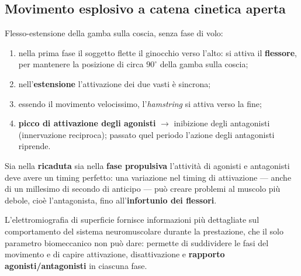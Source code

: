 \subsection{Movimento esplosivo a catena cinetica aperta}
Flesso-estensione della gamba sulla coscia, senza fase di volo:
\begin{enumerate}
  \item nella prima fase il soggetto flette il ginocchio verso l'alto: si attiva il
    \textbf{flessore}, per mantenere la posizione di circa $90^\circ$ della gamba sulla coscia;
  \item nell'\textbf{estensione} l'attivazione dei due vasti è sincrona;
  \item essendo il movimento velocissimo, l'\textit{hamstring} si attiva verso la fine;
  \item \textbf{picco di attivazione degli agonisti} $\rightarrow$ inibizione degli antagonisti
    (innervazione reciproca); passato quel periodo l'azione degli antagonisti riprende.
\end{enumerate}

Sia nella \textbf{ricaduta} sia nella \textbf{fase propulsiva} l'attività di agonisti e antagonisti
deve avere un timing perfetto: una variazione nel timing di attivazione --- anche di un millesimo di
secondo di anticipo --- può creare problemi al muscolo più debole, cioè l'antagonista, fino
all'\textbf{infortunio dei flessori}.

L'elettromiografia di superficie fornisce informazioni più dettagliate sul comportamento del sistema
neuromuscolare durante la prestazione, che il solo parametro biomeccanico non può dare: permette di
suddividere le fasi del movimento e di capire attivazione, disattivazione e \textbf{rapporto
agonisti/antagonisti} in ciascuna fase.
